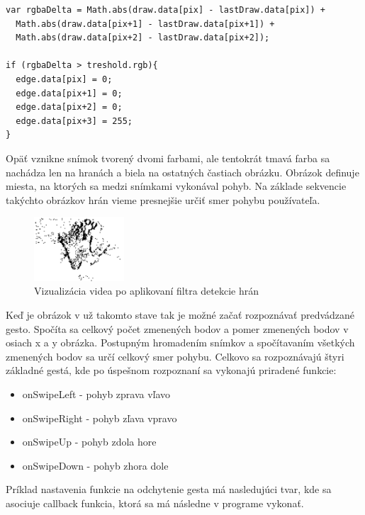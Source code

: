 \begin{lstlisting}
var rgbaDelta = Math.abs(draw.data[pix] - lastDraw.data[pix]) +
  Math.abs(draw.data[pix+1] - lastDraw.data[pix+1]) +
  Math.abs(draw.data[pix+2] - lastDraw.data[pix+2]);

if (rgbaDelta > treshold.rgb){
  edge.data[pix] = 0;
  edge.data[pix+1] = 0;
  edge.data[pix+2] = 0;
  edge.data[pix+3] = 255;
}
\end{lstlisting}

Opäť vznikne snímok tvorený dvomi farbami, ale tentokrát tmavá farba sa nachádza len na hranách a biela na ostatných častiach obrázku. Obrázok definuje miesta, na ktorých sa medzi snímkami vykonával pohyb. Na základe sekvencie takýchto obrázkov hrán vieme presnejšie určiť smer pohybu používateľa.

\begin{figure}[H]
  \centering
  \includegraphics[width=0.3\textwidth]{img/motion/edges.png}
  \caption[Vizualizácia videa po aplikovaní filtra detekcie hrán]{
    Vizualizácia videa po aplikovaní filtra detekcie hrán}
  \label{fig: motion-edges}
\end{figure}

Keď je obrázok v už takomto stave tak je možné začať rozpoznávať predvádzané gesto. Spočíta sa celkový počet zmenených bodov a pomer zmenených bodov v osiach x a y obrázka. Postupným hromadením snímkov a spočítavaním všetkých zmenených bodov sa určí celkový smer pohybu. Celkovo sa rozpoznávajú štyri základné gestá, kde po úspešnom rozpoznaní sa vykonajú priradené funkcie:

\begin{itemize}
  \item onSwipeLeft - pohyb zprava vľavo
  \item onSwipeRight - pohyb zľava vpravo
  \item onSwipeUp - pohyb zdola hore
  \item onSwipeDown - pohyb zhora dole 
\end{itemize}

Príklad nastavenia funkcie na odchytenie gesta má nasledujúci tvar, kde sa asociuje callback funkcia, ktorá sa má následne v programe vykonať.

